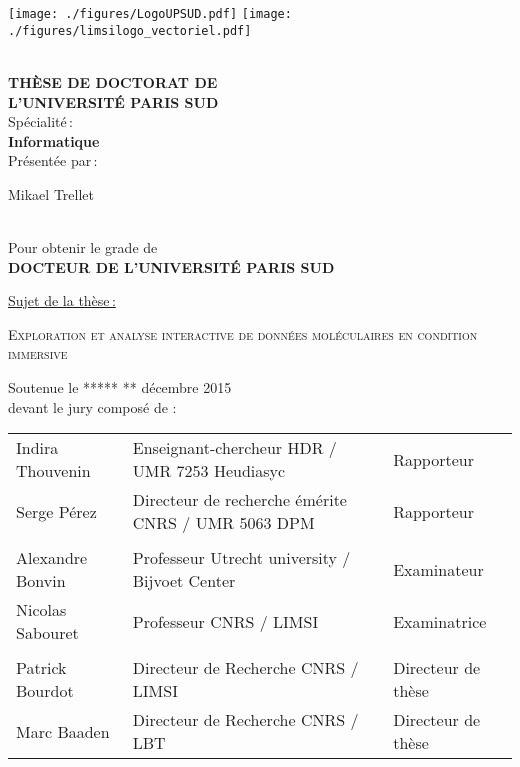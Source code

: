 \begin{titlepage}

\texttt{[image: ./figures/LogoUPSUD.pdf]}\hfill
\texttt{[image: ./figures/limsilogo\_vectoriel.pdf]}\hfill
\\
\\



\begin{center}
 \textbf{THÈSE DE DOCTORAT DE\\ L'UNIVERSITÉ PARIS SUD\\}
Spécialité\,:\\
\textbf{Informatique}\\ 
Présentée par\,:\\ 
\begin{LARGE}
Mikael Trellet\end{LARGE}\\
Pour obtenir le grade de\\
\textbf{DOCTEUR DE L'UNIVERSITÉ PARIS SUD}
\end{center}

\noindent \underline{Sujet de la thèse\,:}\\
\begin{center}
\begin{Large}
{\textsc{Exploration et analyse interactive de données moléculaires en condition immersive}}
\end{Large}
\end{center}

Soutenue le ***** ** décembre 2015\\

devant le jury composé de :\\
\begin{center}
	\begin{tabular}{l l l}
	
	Indira Thouvenin 	& Enseignant-chercheur HDR / UMR 7253 Heudiasyc		& Rapporteur\\ 
	Serge Pérez		& Directeur de recherche émérite CNRS / UMR 5063 DPM		& Rapporteur\\ %
	& &\\
	Alexandre Bonvin	& Professeur Utrecht university / Bijvoet Center	 	& Examinateur\\ 
	Nicolas Sabouret	& Professeur CNRS / LIMSI				& Examinatrice\\ 
	& &\\	
	Patrick Bourdot 	& Directeur de Recherche CNRS / LIMSI				& Directeur de thèse\\ 
	Marc Baaden 	& Directeur de Recherche CNRS / LBT				& Directeur de thèse\\ 
	

\end{tabular}
\end{center}
\end{titlepage}
